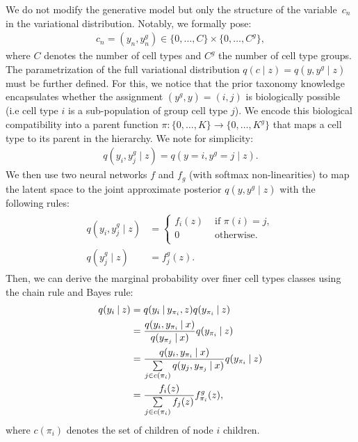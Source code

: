 We do not modify the generative model but only the structure of the variable~$c_n$ in the variational distribution. Notably, we formally pose: 
\begin{align}
    c_n = (y_n, y^g_n) \in \{0, \ldots, C\} \times \{0, \ldots, C^g\},
\end{align} 
where $C$ denotes the number of cell types and $C^g$ the number of cell type groups. The parametrization of the full variational distribution $q(c \mid z) = q(y, y^g \mid z)$ must be further defined. For this, we notice that the prior taxonomy knowledge encapsulates whether the assignment $(y^g, y) = (i, j)$ is biologically possible (i.e cell type $i$ is a sub-population of group cell type $j$). We encode this biological compatibility into a parent function $\pi: \{0, \ldots, K\} \rightarrow \{0, \ldots, K^g\}$ that maps a cell type to its parent in the hierarchy. We note for simplicity:
\begin{align}
    q(y_i, y^g_j \mid z) = q(y = i, y^g = j \mid z).
\end{align}
We then use two neural networks $f$ and $f_g$ (with softmax non-linearities) to map the latent space to the joint approximate posterior $ q(y, y^g \mid z)$ with the following rules:
\begin{align}
\begin{split}
q(y_i, y^g_j \mid z) &=
\begin{cases}
f_i(z) & \text{ if } \pi(i) = j,\\
0 & \text{ otherwise}.\\
\end{cases} \\
q(y^g_j \mid z) &= f^g_j(z).
\end{split}
\end{align}
Then, we can derive the marginal probability over finer cell types classes using the chain rule and Bayes rule: 
\begin{align} 
    q(y_i \:\lvert\: z) &=  q(y_i \:\lvert\: y_{\pi_i} , z) q(y_{\pi_i} \:\lvert\: z)\\
     &= \frac{q(y_i, y_{\pi_i} \:\lvert\:  x)}{q(y_{\pi_j} \:\lvert\:  x)} q(y_{\pi_i} \:\lvert\: z)\\
    & = \frac{q(y_i, y_{\pi_i} \:\lvert\:  x)}{\sum\limits_{j \in c(\pi_i)} q(y_j, y_{\pi_j} \:\lvert\:  x)}q(y_{\pi_i} \:\lvert\: z)\\
    & = \frac{f_i(z)}{\sum\limits_{j \in c(\pi_i)} f_j(z)}f^g_{\pi_i}(z),
\end{align}
where $c(\pi_i)$ denotes the set of children of node $i$ children.


